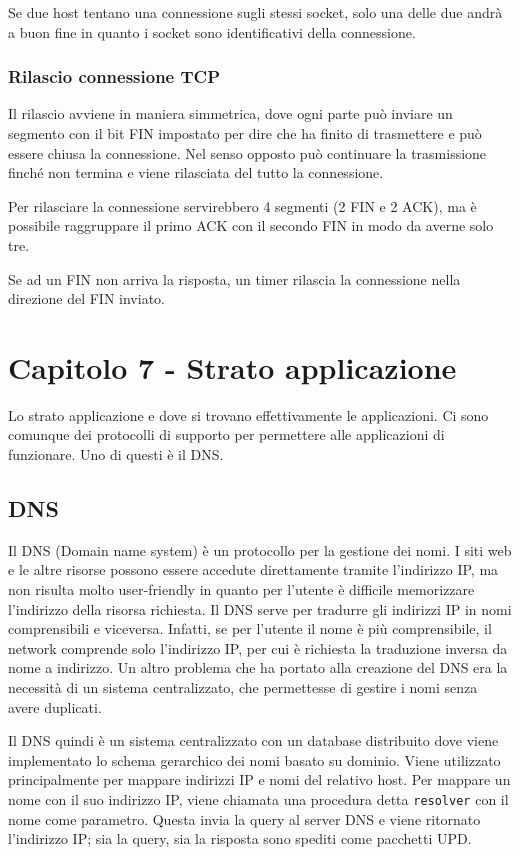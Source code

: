 Se due host tentano una connessione sugli stessi socket, solo una delle due andrà a buon fine in quanto i socket sono identificativi della connessione.

\subsubsection{Rilascio connessione TCP}
Il rilascio avviene in maniera simmetrica, dove ogni parte può inviare un segmento con il bit FIN impostato per dire che ha finito di trasmettere e può essere chiusa la connessione.
Nel senso opposto può continuare la trasmissione finché non termina e viene rilasciata del tutto la connessione.

Per rilasciare la connessione servirebbero 4 segmenti (2 FIN e 2 ACK), ma è possibile raggruppare il primo ACK con il secondo FIN in modo da averne solo tre.

Se ad un FIN non arriva la risposta, un timer rilascia la connessione nella direzione del FIN inviato.

\newpage
\section{Capitolo 7 - Strato applicazione}

Lo strato applicazione e dove si trovano effettivamente le applicazioni.
Ci sono comunque dei protocolli di supporto per permettere alle applicazioni di funzionare.
Uno di questi è il DNS.

\subsection{DNS}

Il DNS (Domain name system) è un protocollo per la gestione dei nomi.
I siti web e le altre risorse possono essere accedute direttamente tramite l'indirizzo IP,
ma non risulta molto user-friendly in quanto per l'utente è difficile memorizzare l'indirizzo della risorsa richiesta.
Il DNS serve per tradurre gli indirizzi IP in nomi comprensibili e viceversa.
Infatti, se per l'utente il nome è più comprensibile, il network comprende solo l'indirizzo IP, per cui è richiesta la traduzione inversa da nome a indirizzo.
Un altro problema che ha portato alla creazione del DNS era la necessità di un sistema centralizzato, che permettesse di gestire i nomi senza avere duplicati.

Il DNS quindi è un sistema centralizzato con un database distribuito dove viene implementato lo schema gerarchico dei nomi basato su dominio. 
Viene utilizzato principalmente per mappare indirizzi IP e nomi del relativo host.
Per mappare un nome con il suo indirizzo IP, viene chiamata una procedura detta \texttt{resolver} con il nome come parametro.
Questa invia la query al server DNS e viene ritornato l'indirizzo IP; sia la query, sia la risposta sono spediti come pacchetti UPD.

